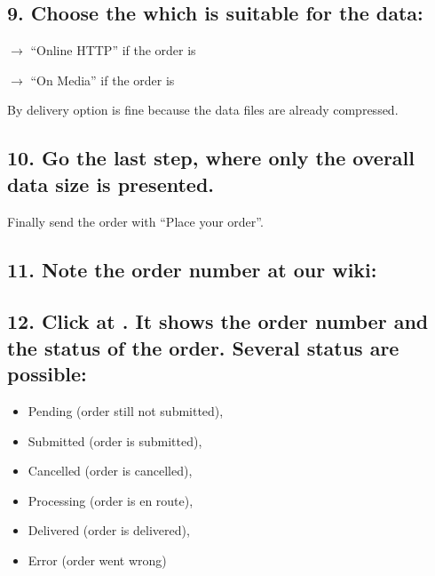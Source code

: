 \documentclass[letterpaper,10pt,english]{sphinxmanual}
\begin{document}
\subsection{9. Choose the  which is suitable for the data:}
\label{\detokenize{ordering_data:choose-the-delivery-method-which-is-suitable-for-the-data}}

\(\rightarrow\) “Online HTTP” if the order is 

\(\rightarrow\) “On Media” if the order is 

By delivery option  is fine because the data files are already compressed.


\subsection{10. Go the last step, where only the overall data size is presented.}
\label{\detokenize{ordering_data:go-the-last-step-where-only-the-overall-data-size-is-presented}}

Finally send the order with “Place your order”.


\subsection{11. Note the order number at our wiki:}
\label{\detokenize{ordering_data:note-the-order-number-at-our-wiki}}



\subsection{12. Click at . It shows the order number and the status of the order. Several status are possible:}
\label{\detokenize{ordering_data:click-at-order-status-it-shows-the-order-number-and-the-status-of-the-order-several-status-are-possible}}\begin{itemize}
\item {} 
Pending (order still not submitted),

\item {} 
Submitted (order is submitted),

\item {} 
Cancelled (order is cancelled),

\item {} 
Processing (order is en route),

\item {} 
Delivered (order is delivered),

\item {} 
Error (order went wrong)

\end{itemize}
\end{document}
